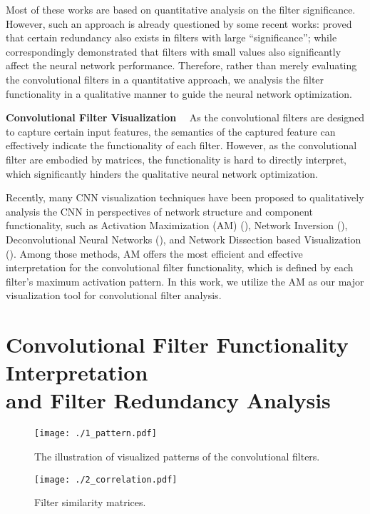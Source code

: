 \documentclass{article} %
\begin{document}
Most of these works are based on quantitative analysis on the filter significance.
	However, such an approach is already questioned by some recent works: \cite{huang2018learning} proved that certain redundancy also exists in filters with large ``significance'';
	while \cite{ye2018rethinking} correspondingly demonstrated that filters with small values also significantly affect the neural network performance.
Therefore, rather than merely evaluating the convolutional filters in a quantitative approach, we analysis the filter functionality in a qualitative manner to guide the neural network optimization.

\textbf{Convolutional Filter Visualization}
~~As the convolutional filters are designed to capture certain input features, the semantics of the captured feature can effectively indicate the functionality of each filter.
	However, as the convolutional filter are embodied by matrices, the  functionality is hard to directly interpret, which significantly hinders the qualitative neural network optimization.

Recently, many CNN visualization techniques have been proposed to qualitatively analysis the CNN in perspectives of network structure and component functionality,
	such as Activation Maximization (AM) (\cite{Yosinski:2015:ICML:AM}), Network Inversion (\cite{mahendran2015:Network-Inversion}), Deconvolutional Neural Networks (\cite{Zeiler:2014:ECCV:DeconvolNet}), and Network Dissection based Visualization (\cite{Zhou:2016:CVPR:Network-Dissection}).
	Among those methods, AM offers the most efficient and effective interpretation for the convolutional filter functionality, which is defined by each filter's maximum activation pattern.
In this work, we utilize the AM as our major visualization tool for convolutional filter analysis.

\section{Convolutional Filter Functionality Interpretation \\ \hspace{5.5mm} and Filter Redundancy Analysis}\label{sec:visual}\begin{figure}
	\begin{minipage}[c]{0.5\linewidth}
		\texttt{[image: ./1\_pattern.pdf]}
		\caption{The illustration of visualized patterns of the convolutional filters.}
		\label{fig:vis}
	\end{minipage}
	\hfill
	\begin{minipage}[c]{0.5\linewidth}
	\vspace{-2mm}
		\texttt{[image: ./2\_correlation.pdf]}
		\vspace{1mm}
		\caption{Filter similarity matrices.}
		\label{fig:sim}
	\end{minipage}
\end{figure}
\end{document}
